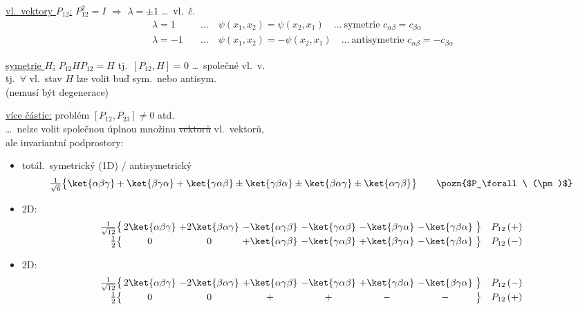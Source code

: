 \underline{vl.\ vektory $P_{12}$:} \quad $P_{12}^2 = I$ \quad $\Rightarrow$ \quad $\lambda = \pm1$ \dots\ vl.\ č.
\begin{align*}
  \lambda = 1 &\quad\dots\quad \psi(x_1,x_2) = \psi(x_2,x_1) \quad\dots\ \text{symetrie } c_{\alpha\beta} = c_{\beta\alpha} \\
  \lambda = -1 &\quad\dots\quad \psi(x_1,x_2) = -\psi(x_2,x_1) \quad\dots\ \text{antisymetrie } c_{\alpha\beta} = -c_{\beta\alpha}
\end{align*}

\underline{symetrie $H$:} \quad $P_{12}HP_{12} = H$ \quad tj.\ $[P_{12},H] = 0$ \dots\ společné vl.\ v. \\
\quad tj.\ $\forall$ vl.\ stav $H$ lze volit buď sym.\ nebo antisym. \\
\quad (nemusí být degenerace)

\underline{více částic:} \quad problém \quad $[P_{12},P_{23}]\neq 0$ \quad atd.
\quad {} \\
\dots\ nelze volit společnou úplnou množinu \sout{vektorů} vl.\ vektorů, \\
ale invariantní podprostory:

\begin{priklad}
\begin{itemize}
  \item totál.\ symetrický (1D) / antisymetrický
  \[
    \tfrac{1}{\sqrt6}\big\{\ket{\alpha\beta\gamma} + \ket{\beta\gamma\alpha} + \ket{\gamma\alpha\beta} \pm \ket{\gamma\beta\alpha} \pm \ket{\beta\alpha\gamma} \pm \ket{\alpha\gamma\beta}\big\}
    \qquad \pozn{$P_\forall\ (\pm)$}
  \]
  \item 2D:
  \[
  \begin{array}{r@{\,}c@{\ }c@{\ }c@{\ }c@{\ }c@{\ }c@{\ }l}
    \frac{1}{\sqrt{12}}\big\{ & 2\ket{\alpha\beta\gamma} & +2\ket{\beta\alpha\gamma} & -\ket{\alpha\gamma\beta} & -\ket{\gamma\alpha\beta} & -\ket{\beta\gamma\alpha} & -\ket{\gamma\beta\alpha} & \big\}\quad P_{12}\,(+) \\[3pt]
    \frac12\big\{ & 0 & 0 & +\ket{\alpha\gamma\beta} & -\ket{\gamma\alpha\beta} & +\ket{\beta\gamma\alpha} & -\ket{\gamma\beta\alpha} & \big\}\quad P_{12}\,(-)
  \end{array}
  \]
  \item 2D:
  \[
  \begin{array}{r@{\,}c@{\ }c@{\ }c@{\ }c@{\ }c@{\ }c@{\ }l}
    \frac{1}{\sqrt{12}}\big\{ & 2\ket{\alpha\beta\gamma} & -2\ket{\beta\alpha\gamma} & +\ket{\alpha\gamma\beta} & -\ket{\gamma\alpha\beta} & +\ket{\gamma\beta\alpha} & -\ket{\beta\gamma\alpha} & \big\}\quad P_{12}\,(-) \\[3pt]
    \frac12\big\{ & 0 & 0 & + & + & - & - & \big\}\quad P_{12}\,(+)
  \end{array}
  \]
\end{itemize}
\end{priklad}

